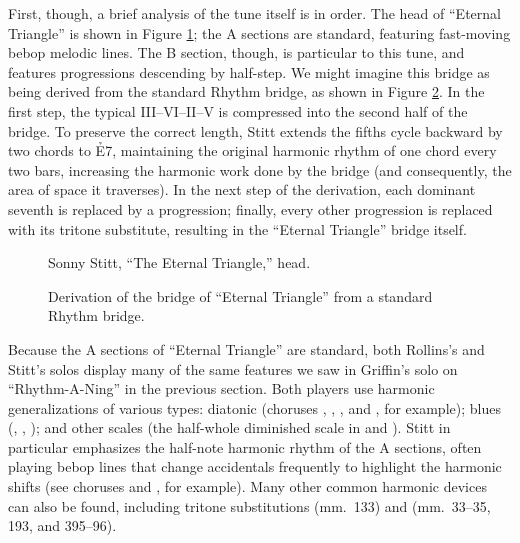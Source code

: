 First, though, a brief analysis of the tune itself is in order. The head of
``Eternal Triangle'' is shown in Figure \ref{et:head-melody}; the A sections
are standard, featuring fast-moving bebop melodic lines. The B section,
though, is particular to this tune, and features \tf progressions descending
by half-step. We might imagine this bridge as being derived from the standard
Rhythm bridge, as shown in Figure \ref{et:bridge-derivation}. In the first
step, the typical III--VI--II--V is compressed into the second half of the
bridge. To preserve the correct length, Stitt extends the fifths cycle
backward by two chords to \h{E7}, maintaining the original harmonic rhythm of
one chord every two bars, increasing the harmonic work done by the bridge (and
consequently, the area of \tf space it traverses). In the next step of the
derivation, each dominant seventh is replaced by a \tf progression;
finally, every other \tf progression is replaced with its tritone
substitute, resulting in the ``Eternal Triangle'' bridge itself.

\begin{figure}[tbp]
  \caption{Sonny Stitt, ``The Eternal Triangle,'' head.}
  \label{et:head-melody}
\end{figure}


\begin{figure}[tbp]
  \caption{Derivation of the bridge of ``Eternal Triangle'' from a standard
    Rhythm bridge.}
  \label{et:bridge-derivation}
\end{figure}

Because the A sections of ``Eternal Triangle'' are standard, both Rollins's
and Stitt's solos display many of the same features we saw in Griffin's solo
on ``Rhythm-A-Ning'' in the previous section. Both players use harmonic
generalizations of various types: diatonic (choruses , ,
, and , for example); blues (, ,
); and other scales (the half-whole diminished scale in
 and ). Stitt in particular emphasizes the half-note
harmonic rhythm of the A sections, often playing bebop lines that change
accidentals frequently to highlight the harmonic shifts (see choruses
 and , for example). Many other common harmonic devices
can also be found, including tritone substitutions (mm.~133) and 
(mm.~33--35, 193, and 395--96).

